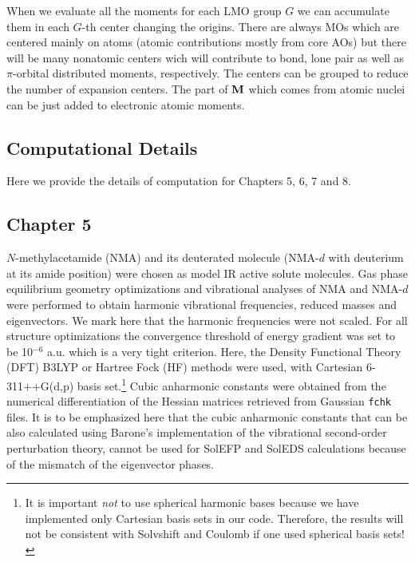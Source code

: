 \documentclass[a4paper,titlepage,twoside,fleqn,12pt]{book}
\begin{document}
\begin{appendices}
\begin{refsection}
When we evaluate all the moments for each LMO group $G$ we can accumulate them in each $G$-th center
changing the origins. There are always MOs which are centered mainly on atoms (atomic contributions
mostly from core AOs) but there will be many nonatomic centers wich will contribute to bond, lone pair
as well as $\pi$\hyp{}orbital distributed moments, respectively. The centers can be grouped to reduce the number
of expansion centers. The part of $\bf M$ which comes from atomic
nuclei can be just added to electronic atomic moments.

\printbibliography[heading=subbibintoc,title={References}]
\end{refsection}


\begin{refsection}
\chapter{Computational Details\label{a:computational-details}}

Here we provide the details of computation for Chapters 5, 6, 7 and 8.

\section{Chapter 5}

$N$-methylacetamide (NMA) and its deuterated molecule
(NMA-$d$ with deuterium at its amide position) 
were chosen as model IR active solute molecules. 
Gas phase equilibrium
geometry optimizations and vibrational analyses of NMA
and NMA-$d$ were performed
to obtain harmonic vibrational frequencies, reduced
masses and eigenvectors.
We mark here that the harmonic frequencies were not scaled. 
For all structure optimizations the convergence
threshold of energy gradient was set to be 10$^{-6}$ a.u.
which is a very tight criterion.
Here, the Density Functional Theory (DFT) B3LYP%
or Hartree Fock (HF) methods were used,
with Cartesian 6-311++G(d,p) basis set.\footnote{It is 
important \emph{not} to use spherical harmonic bases
because we have implemented only Cartesian basis sets 
in our code. Therefore, the results will not be consistent
with {\sc Solvshift} and {\sc Coulomb} if one used spherical basis sets!}%
Cubic anharmonic constants were obtained from the numerical
differentiation of the Hessian matrices retrieved from Gaussian
\verb+fchk+ files.
It is to be emphasized here that the cubic anharmonic constants
that can be also calculated using Barone’s implementation%
of
the vibrational second\hyp{}order perturbation theory,
cannot be used for SolEFP and SolEDS calculations because of the mismatch of the eigenvector
phases.


\end{refsection}
\end{appendices}
\end{document}
